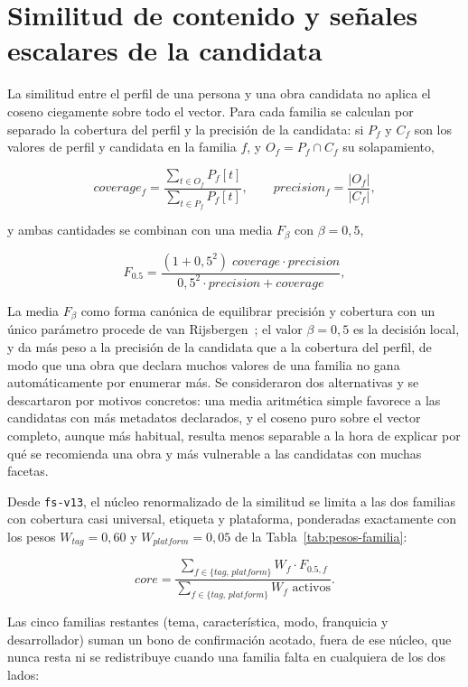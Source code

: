 \section{Similitud de contenido y señales escalares de la candidata}\label{sec:alg-similitud}

La similitud entre el perfil de una persona y una obra candidata no aplica el coseno
ciegamente sobre todo el vector. Para cada familia se calculan por separado la cobertura del
perfil y la precisión de la candidata: si \(P_f\) y \(C_f\) son los valores de perfil y
candidata en la familia \(f\), y \(O_f = P_f \cap C_f\) su solapamiento,

\[
coverage_f = \frac{\sum_{t \in O_f} P_f[t]}{\sum_{t \in P_f} P_f[t]}, \qquad
precision_f = \frac{|O_f|}{|C_f|} ,
\]

y ambas cantidades se combinan con una media \(F_\beta\) con \(\beta = 0{,}5\),

\begin{equation}\label{eq:fbeta}
F_{0.5} = \frac{(1+0{,}5^2)\;coverage \cdot precision}{0{,}5^2 \cdot precision + coverage} ,
\end{equation}

La media \(F_\beta\) como forma canónica de equilibrar precisión y cobertura con un único
parámetro procede de van Rijsbergen~\cite{vanrijsbergen1979information}; el valor
\(\beta = 0{,}5\) es la decisión local, y da más peso a la precisión de la candidata que a la
cobertura del perfil, de modo que una obra que declara muchos valores de una familia no gana
automáticamente por enumerar más. Se consideraron dos alternativas y se descartaron por
motivos concretos: una media aritmética simple favorece a las candidatas con más metadatos
declarados, y el coseno puro sobre el vector completo, aunque más habitual, resulta menos
separable a la hora de explicar por qué se recomienda una obra y más vulnerable a las
candidatas con muchas facetas.

Desde \texttt{fs-v13}, el núcleo renormalizado de la similitud se limita a las dos familias con
cobertura casi universal, etiqueta y plataforma, ponderadas exactamente con los pesos
\(W_{tag}=0{,}60\) y \(W_{platform}=0{,}05\) de la Tabla~\ref{tab:pesos-familia}:

\[
core = \frac{\sum_{f \in \{tag,\,platform\}} W_f \cdot F_{0.5,f}}{\sum_{f \in \{tag,\,platform\}} W_f \text{ activos}} .
\]

Las cinco familias restantes (tema, característica, modo, franquicia y desarrollador) suman
un bono de confirmación acotado, fuera de ese núcleo, que nunca resta ni se redistribuye
cuando una familia falta en cualquiera de los dos lados:

